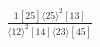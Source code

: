 \documentclass[varwidth, border=5pt]{standalone}
\begin{document}
\begin{my}
$\begin{gathered}
\scriptscriptstyle\frac{1[25]⟨25⟩^2[13]}{⟨12⟩^2[14]⟨23⟩[45]}
\end{gathered}$
\end{my}
\end{document}
